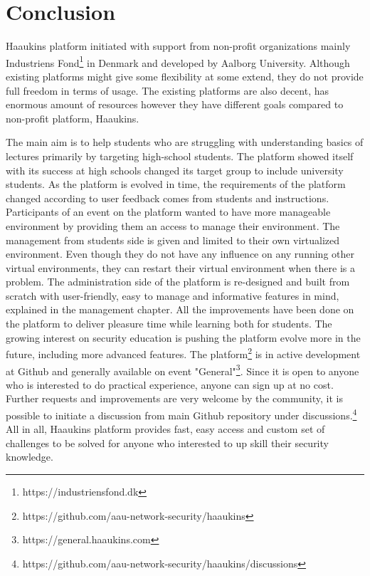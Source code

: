\chapter{Conclusion}

Haaukins platform initiated with support from non-profit organizations mainly Industriens Fond\footnote{https://industriensfond.dk} in Denmark and developed by Aalborg University. Although existing platforms might give some flexibility at some extend, they do not provide full freedom in terms of usage. The existing platforms are also decent, has enormous amount of resources however they have different goals compared to non-profit platform, Haaukins. 


The main aim is to help students who are struggling with understanding basics of lectures primarily by targeting high-school students. The platform showed itself with its success at high schools changed its target group to include university students. As the platform is evolved in time, the requirements of the platform changed according to user feedback comes from students and instructions. Participants of an event on the platform wanted to have more manageable environment by providing them an access to manage their environment. The management from students side is given and limited to their own virtualized environment. Even though they do not have any influence on any running other virtual environments, they can restart their virtual environment when there is a problem. The administration side of the platform is re-designed and built from scratch with user-friendly, easy to manage and informative features in mind, explained in the management chapter.  All the improvements have been done on the platform to deliver pleasure time while learning both for students. The growing interest on security education is pushing the platform evolve more in the future, including more advanced features. The platform\footnote{https://github.com/aau-network-security/haaukins} is in active development at Github and generally available on event "General"\footnote{https://general.haaukins.com}. Since it is open to anyone who is interested to do practical experience, anyone can sign up at no cost. 
Further requests and improvements are very welcome by the community, it is possible to initiate a discussion from main Github repository under discussions.\footnote{https://github.com/aau-network-security/haaukins/discussions}
All in all, Haaukins platform provides fast, easy access and custom set of challenges to be solved for anyone who interested to up skill their security knowledge.